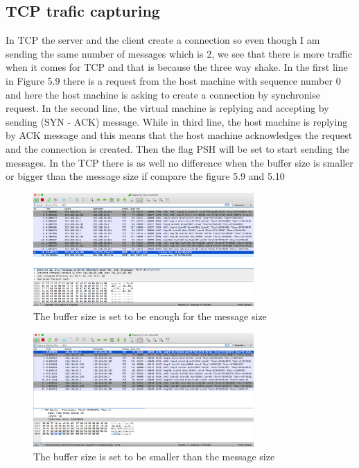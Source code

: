 \documentclass[a4paper,12pt]{article}
\begin{document}
\subsection{TCP trafic capturing}
In TCP the server and the client create a connection so even though I am sending the same number of messages which is 2, we see that there is more traffic when it comes for TCP and that is because the three way shake. 
In the first line in Figure 5.9  there is a request from the host machine with sequence number 0 and here the host machine is asking to create a connection by synchronise request.
In the second line, the virtual machine is replying and accepting by sending (SYN - ACK) message. While in third line, the host machine is replying by ACK message and this means that the host machine acknowledges the request and the connection is created.
Then the flag PSH will be set to start sending the messages.	In the TCP there is as well no difference when the buffer size is smaller or bigger than the message size if compare the figure 5.9 and 5.10

\begin{figure}[h]
    \centering
    \includegraphics[width=0.75\textwidth]{figure8}
    \caption{The buffer size is set to be enough for the message size}
    \label{}
\end{figure}

\begin{figure}[h]
    \centering
    \includegraphics[width=0.75\textwidth]{figure9}
    \caption{The buffer size is set to be smaller than the message size}
    \label{}
\end{figure}
\end{document}
